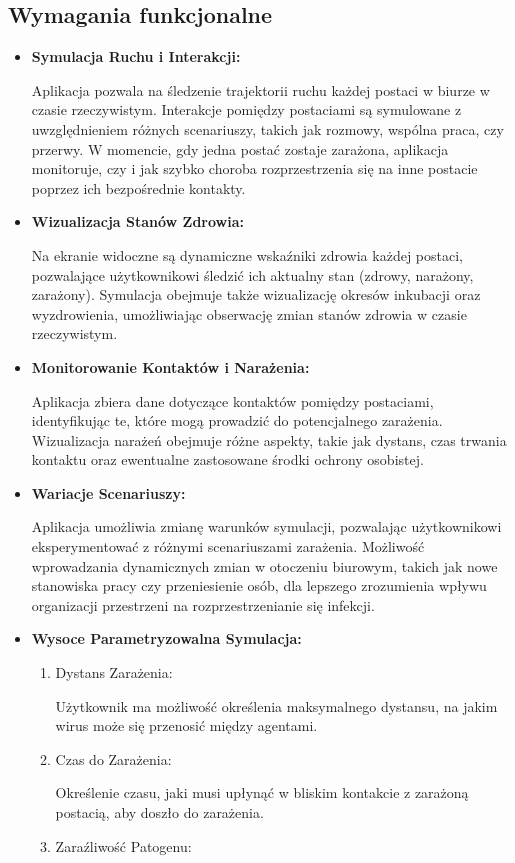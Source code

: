 \subsection{\textbf{Wymagania funkcjonalne}}
\begin{itemize}
	\item \textbf{ Symulacja Ruchu i Interakcji:}
	
	Aplikacja pozwala na śledzenie trajektorii ruchu każdej postaci w biurze w czasie rzeczywistym.
	Interakcje pomiędzy postaciami są symulowane z uwzględnieniem różnych scenariuszy, takich jak rozmowy, wspólna praca, czy przerwy.
	W momencie, gdy jedna postać zostaje zarażona, aplikacja monitoruje, czy i jak szybko choroba rozprzestrzenia się na inne postacie poprzez ich bezpośrednie kontakty.
	\item \textbf{Wizualizacja Stanów Zdrowia:}
	
	Na ekranie widoczne są dynamiczne wskaźniki zdrowia każdej postaci, pozwalające użytkownikowi śledzić ich aktualny stan (zdrowy, narażony, zarażony).
	Symulacja obejmuje także wizualizację okresów inkubacji oraz wyzdrowienia, umożliwiając obserwację zmian stanów zdrowia w czasie rzeczywistym.
	\item \textbf{Monitorowanie Kontaktów i Narażenia:}
	
	Aplikacja zbiera dane dotyczące kontaktów pomiędzy postaciami, identyfikując te, które mogą prowadzić do potencjalnego zarażenia.
	Wizualizacja narażeń obejmuje różne aspekty, takie jak dystans, czas trwania kontaktu oraz ewentualne zastosowane środki ochrony osobistej.
	\item \textbf{Wariacje Scenariuszy:}
	
	Aplikacja umożliwia zmianę warunków symulacji, pozwalając użytkownikowi eksperymentować z różnymi scenariuszami zarażenia.
	Możliwość wprowadzania dynamicznych zmian w otoczeniu biurowym, takich jak nowe stanowiska pracy czy przeniesienie osób, dla lepszego zrozumienia wpływu organizacji przestrzeni na rozprzestrzenianie się infekcji.
	\item \textbf{Wysoce Parametryzowalna Symulacja:}
	\begin{enumerate}
		\item Dystans Zarażenia:
		
		Użytkownik ma możliwość określenia maksymalnego dystansu, na jakim wirus może się przenosić między agentami.
		\item Czas do Zarażenia:
		
		Określenie czasu, jaki musi upłynąć w bliskim kontakcie z zarażoną postacią, aby doszło do zarażenia.
		\item Zaraźliwość Patogenu:
		

\end{enumerate}
\end{itemize}
